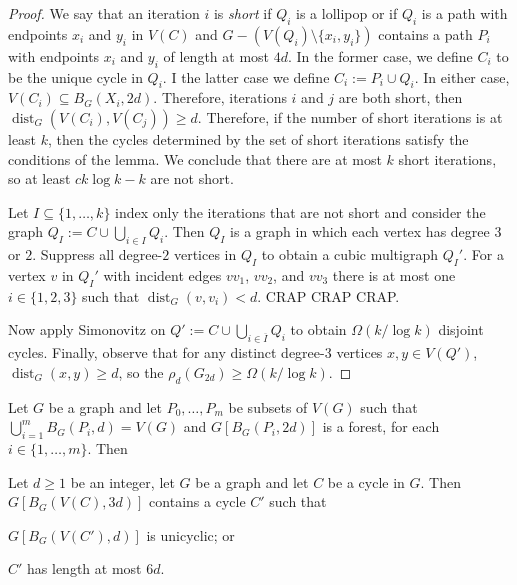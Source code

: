 \documentclass{patmorin}
\renewcommand{\ge}{\geqslant}
\newcommand{\defin}[1]{\emph{\textcolor{brightmaroon}{#1}}}
\DeclareMathOperator{\dist}{dist}
\begin{document}
\begin{proof}
  We say that an iteration $i$ is \defin{short} if $Q_i$ is a lollipop or if $Q_i$ is a path with endpoints $x_i$ and $y_i$ in $V(C)$ and $G-(V(Q_i)\setminus\{x_i,y_i\})$ contains a path $P_i$ with endpoints $x_i$ and $y_i$ of length at most $4d$.  In the former case, we define $C_i$ to be the unique cycle in $Q_i$. I the latter case we define $C_i:=P_i\cup Q_i$.  In either case, $V(C_i)\subseteq B_G(X_i,2d)$.  Therefore, iterations $i$ and $j$ are both short, then $\dist_G(V(C_i),V(C_j))\ge d$.  Therefore, if the number of short iterations is at least $k$, then the cycles determined by the set of short iterations satisfy the conditions of the lemma.  We conclude that there are at most $k$ short iterations, so at least $ck\log k-k$ are not short.

  Let $I\subseteq \{1,\ldots,k\}$ index only the iterations that are not short and consider the graph $Q_I:=C\cup\bigcup_{i\in I} Q_i$.  Then $Q_I$ is a graph in which each vertex has degree $3$ or $2$.  Suppress all degree-$2$ vertices in $Q_I$ to obtain a cubic multigraph $Q_I'$.  For a vertex $v$ in $Q_I'$ with incident edges $vv_1$, $vv_2$, and $vv_3$ there is at most one $i\in\{1,2,3\}$ such that $\dist_G(v,v_i)<d$.  CRAP CRAP CRAP.



  Now apply Simonovitz on $Q':=C\cup \bigcup_{i\in\overline{I}} Q_i$ to obtain $\Omega(k/\log k)$ disjoint cycles.  Finally, observe that for any distinct degree-$3$ vertices $x,y\in V(Q')$, $\dist_G(x,y)\ge d$, so the $\rho_d(G_{2d})\ge \Omega(k/\log k)$.
\end{proof}



\begin{lem}
  Let $G$ be a graph and let $P_0,\ldots,P_m$ be subsets of $V(G)$ such that
  $\bigcup_{i=1}^m B_G(P_i,d)=V(G)$ and
  $G[B_G(P_i,2d)]$ is a forest, for each $i\in\{1,\ldots,m\}$.  Then
\end{lem}





\begin{lem}
  Let $d\ge 1$ be an integer, let $G$ be a graph and let $C$ be a cycle in $G$.  Then $G[B_G(V(C),3d)]$ contains a cycle $C'$ such that
  \begin{compactenum}
    \item $G[B_G(V(C'),d)]$ is unicyclic; or
    \item $C'$ has length at most $6d$.
  \end{compactenum}
\end{lem}
\end{document}
